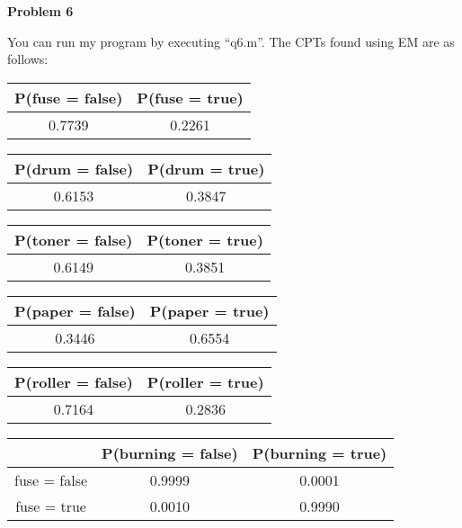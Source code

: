 \textbf{Problem 6}

You can run my program by executing ``q6.m''. The CPTs found using EM are as follows:

\begin{table}[h]
	\begin{tabular}{|c|c|}
		\hline
		P(fuse = false) & P(fuse = true) \\ \hline
		0.7739 & 0.2261 \\ \hline
	\end{tabular}
\end{table}

\begin{table}[h]
	\begin{tabular}{|c|c|}
		\hline
		P(drum = false) & P(drum = true) \\ \hline
		0.6153 & 0.3847 \\ \hline
	\end{tabular}
\end{table}

\begin{table}[h]
	\begin{tabular}{|c|c|}
		\hline
		P(toner = false) & P(toner = true) \\ \hline
		0.6149 & 0.3851 \\ \hline
	\end{tabular}
\end{table}

\begin{table}[h!]
	\begin{tabular}{|c|c|}
		\hline
		P(paper = false) & P(paper = true) \\ \hline
		0.3446 & 0.6554 \\ \hline
	\end{tabular}
\end{table}

\begin{table}[h!]
	\begin{tabular}{|c|c|}
		\hline
		P(roller = false) & P(roller = true) \\ \hline
		0.7164 & 0.2836 \\ \hline
	\end{tabular}
\end{table}

\begin{table}[h!]
	\begin{tabular}{|c|c|c|}
		\hline
		& P(burning = false) & P(burning = true) \\ \hline
		fuse = false & 0.9999 & 0.0001 \\ \hline
		fuse = true & 0.0010 & 0.9990 \\ \hline
	\end{tabular}
\end{table}

